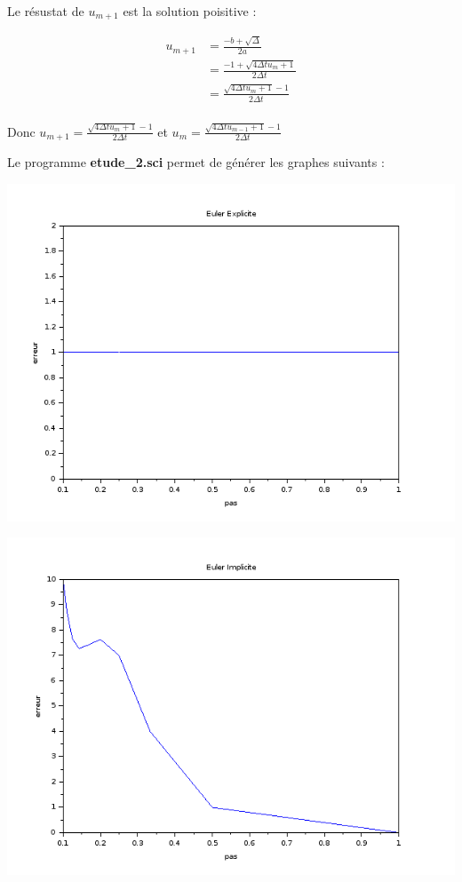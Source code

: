\documentclass[12pt, letterpaper]{article}
\begin{document}
\begin{enumerate}
  Le résustat de $u_{m+1}$ est la solution poisitive :

  \begin{equation*}
    \begin{split}
      u_{m+1} & = \frac{- b + \sqrt{\Delta}}{2a} \\
      & = \frac{- 1 + \sqrt{4 \Delta t u_m + 1}}{2 \Delta t} \\
      & = \frac{\sqrt{4 \Delta t u_m + 1} - 1}{2 \Delta t} \\
    \end{split}
  \end{equation*}

  Donc $ u_{m+1} = \frac{\sqrt{4 \Delta t u_m + 1} - 1}{2 \Delta t}$
  et $ u_m = \frac{\sqrt{4 \Delta t u_{m-1} + 1} - 1}{2 \Delta t}$
  
  Le programme \textbf{etude\_2.sci} permet de générer les graphes
  suivants :

  \includegraphics[scale = 0.6]{img/etude_2_ee.png}

  \includegraphics[scale = 0.6]{img/etude_2_ei.png}


\end{enumerate}
\end{document}
